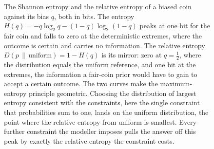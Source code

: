 \begin{figure}[htbp]
\centering
{}
\caption[Shannon entropy and relative entropy of a biased coin]{The Shannon
entropy and the relative entropy of a biased coin against its bias $q$, both in
bits. The entropy $H(q) = -q\log_2 q - (1-q)\log_2(1-q)$ peaks at one bit for the
fair coin and falls to zero at the deterministic extremes, where the outcome is
certain and carries no information. The relative entropy $D(p\,\|\,\text{uniform})
= 1 - H(q)$ is its mirror: zero at $q = \tfrac12$, where the distribution equals
the uniform reference, and one bit at the extremes, the information a fair-coin
prior would have to gain to accept a certain outcome. The two curves make the
maximum-entropy principle geometric. Choosing the distribution of largest entropy
consistent with the constraints, here the single constraint that probabilities
sum to one, lands on the uniform distribution, the point where the relative
entropy from uniform is smallest. Every further constraint the modeller imposes
pulls the answer off this peak by exactly the relative entropy the constraint
costs.}
\label{fig:vol04ch04:relative-entropy}
\end{figure}
